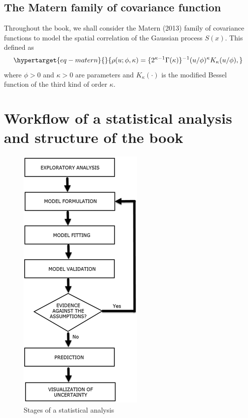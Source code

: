\documentclass[
  letterpaper,
]{krantz}
\begin{document}
\hypertarget{the-matern-family-of-covariance-function}{%
\subsection{The Matern family of covariance
function}\label{the-matern-family-of-covariance-function}}

Throughout the book, we shall consider the Matern (2013) family of
covariance functions to model the spatial correlation of the Gaussian
process \(S(x)\). This defined as
\begin{equation}\protect\hypertarget{eq-matern}{}{
\rho(u;\phi,\kappa) =\{2^{\kappa-1} \Gamma(\kappa)\}^{-1} (u/\phi)^\kappa K_\kappa(u/\phi),
}\label{eq-matern}\end{equation} where \(\phi>0\) and \(\kappa>0\) are
parameters and \(K_\kappa(\cdot)\) is the modified Bessel function of
the third kind of order \(\kappa\).

\hypertarget{workflow-of-a-statistical-analysis-and-structure-of-the-book}{%
\section{Workflow of a statistical analysis and structure of the
book}\label{workflow-of-a-statistical-analysis-and-structure-of-the-book}}

\begin{figure}

{\centering \includegraphics{./figures/workflow_diagram.png}

}

\caption{\label{fig-stages}Stages of a statistical analysis}

\end{figure}
\end{document}
